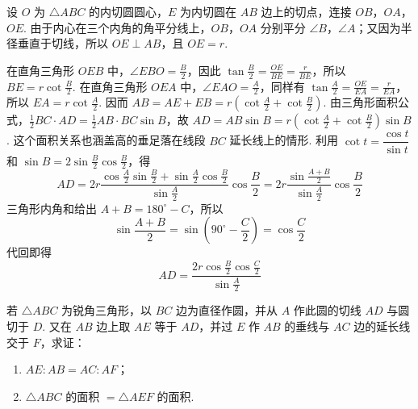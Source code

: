 \begin{solution}
设 \(O\) 为 \(\triangle ABC\) 的内切圆圆心，\(E\) 为内切圆在 \(AB\) 边上的切点，连接 \(OB\)，\(OA\)，\(OE\). 由于内心在三个内角的角平分线上，\(OB\)，\(OA\) 分别平分 \(\angle B\)，\(\angle A\)；又因为半径垂直于切线，所以 \(OE\perp AB\)，且 \(OE=r\).

在直角三角形 \(OEB\) 中，\(\angle EBO=\frac{B}{2}\)，因此 \(\tan\frac{B}{2}=\frac{OE}{BE}=\frac{r}{BE}\)，所以 \(BE=r\cot\frac{B}{2}\).
在直角三角形 \(OEA\) 中，\(\angle EAO=\frac{A}{2}\)，同样有
\(\tan\frac{A}{2}=\frac{OE}{EA}=\frac{r}{EA}\)，所以 \(EA=r\cot\frac{A}{2}\). 因而 \(AB=AE+EB=r\left(\cot\frac{A}{2}+\cot\frac{B}{2}\right)\).
由三角形面积公式，\(\frac12BC\cdot AD=\frac12AB\cdot BC\sin B\)，故 \(AD=AB\sin B=r\left(\cot\frac{A}{2}+\cot\frac{B}{2}\right)\sin B\). 这个面积关系也涵盖高的垂足落在线段 \(BC\) 延长线上的情形.
利用 \(\cot t=\dfrac{\cos t}{\sin t}\) 和 \(\sin B=2\sin\frac{B}{2}\cos\frac{B}{2}\)，得
\[
AD=2r\frac{\cos\frac{A}{2}\sin\frac{B}{2}+\sin\frac{A}{2}\cos\frac{B}{2}}{\sin\frac{A}{2}}\cos\frac{B}{2}
=2r\frac{\sin\frac{A+B}{2}}{\sin\frac{A}{2}}\cos\frac{B}{2}
\]
三角形内角和给出 \(A+B=180^{\circ}-C\)，所以
\[
\sin\frac{A+B}{2}=\sin\left(90^{\circ}-\frac{C}{2}\right)=\cos\frac{C}{2}
\]
代回即得
\[
AD=\frac{2r\cos\frac{B}{2}\cos\frac{C}{2}}{\sin\frac{A}{2}}
\]

\end{solution}

\begin{problem}
若 \(\triangle ABC\) 为锐角三角形，以 \(BC\) 边为直径作圆，并从 \(A\) 作此圆的切线 \(AD\) 与圆切于 \(D\). 又在 \(AB\) 边上取 \(AE\) 等于 \(AD\)，并过 \(E\) 作 \(AB\) 的垂线与 \(AC\) 边的延长线交于 \(F\)，求证：

\begin{enumerate}
\item \(AE:AB=AC:AF\)；
\item \(\triangle ABC\) 的面积 \(=\triangle AEF\) 的面积.
\end{enumerate}
\end{problem}

